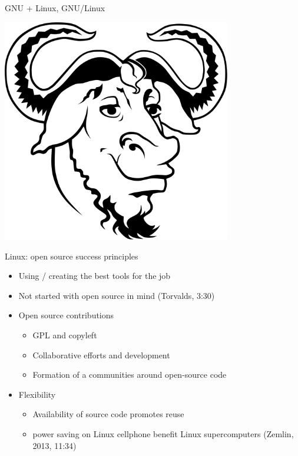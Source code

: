 \begin{frame}{GNU + Linux, GNU/Linux}
\begin{minipage}{0.45\textwidth}
\includegraphics[width = 0.75\textwidth]{gnu.png}
\end{minipage}
\end{frame}




\begin{frame}{Linux: open source success principles}
\begin{itemize}
 \item Using / creating the best tools for the job
 \item Not started with open source in mind (Torvalds, 3:30)
 \item Open source contributions
 \begin{itemize}
   \item GPL and copyleft
   \item Collaborative efforts and development
   \item Formation of a communities around open-source code
 \end{itemize}
 \item Flexibility
 \begin{itemize}
   \item Availability of source code promotes reuse
   \item power saving on Linux cellphone benefit Linux supercomputers (Zemlin, 2013, 11:34)
  \end{itemize}
\end{itemize}
\end{frame}

